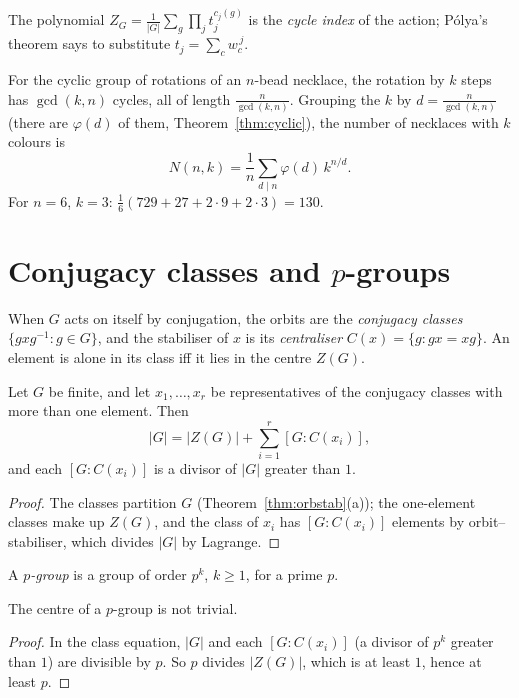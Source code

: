 The polynomial $Z_G=\frac1{|G|}\sum_g\prod_jt_j^{c_j(g)}$ is the \emph{cycle index} of the action; P\'olya's theorem says to substitute $t_j=\sum_cw_c^{\,j}$.

\begin{example}\label{ex:necklaceformula}
For the cyclic group of rotations of an $n$-bead necklace, the rotation by $k$ steps has $\gcd(k,n)$ cycles, all of length $\frac n{\gcd(k,n)}$. Grouping the $k$ by $d=\frac n{\gcd(k,n)}$ (there are $\varphi(d)$ of them, Theorem~\ref{thm:cyclic}), the number of necklaces with $k$ colours is
\[
N(n,k)=\frac1n\sum_{d\mid n}\varphi(d)\,k^{n/d}.
\]
For $n=6$, $k=3$: $\frac16(729+27+2\cdot9+2\cdot3)=130$.
\end{example}

\section{Conjugacy classes and \texorpdfstring{$p$}{p}-groups}

When $G$ acts on itself by conjugation, the orbits are the \emph{conjugacy classes} $\{gxg^{-1}:g\in G\}$, and the stabiliser of $x$ is its \emph{centraliser} $C(x)=\{g:gx=xg\}$. An element is alone in its class iff it lies in the centre $Z(G)$.

\begin{theorem}\label{thm:classeq}
Let $G$ be finite, and let $x_1,\dots,x_r$ be representatives of the conjugacy classes with more than one element. Then
\[
|G|=|Z(G)|+\sum_{i=1}^r[G:C(x_i)],
\]
and each $[G:C(x_i)]$ is a divisor of $|G|$ greater than $1$.
\end{theorem}
\begin{proof}
The classes partition $G$ (Theorem~\ref{thm:orbstab}(a)); the one-element classes make up $Z(G)$, and the class of $x_i$ has $[G:C(x_i)]$ elements by orbit--stabiliser, which divides $|G|$ by Lagrange.
\end{proof}

A \emph{$p$-group} is a group of order $p^k$, $k\ge1$, for a prime $p$.

\begin{corollary}\label{cor:pgroup}
The centre of a $p$-group is not trivial.
\end{corollary}
\begin{proof}
In the class equation, $|G|$ and each $[G:C(x_i)]$ (a divisor of $p^k$ greater than $1$) are divisible by $p$. So $p$ divides $|Z(G)|$, which is at least $1$, hence at least $p$.
\end{proof}

